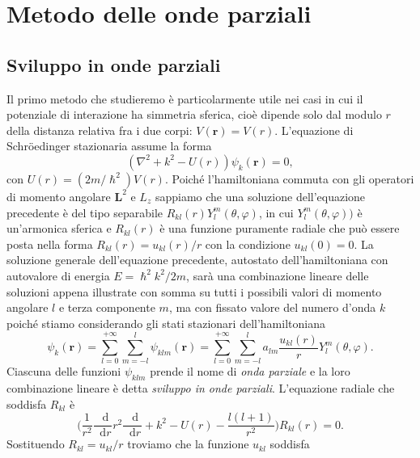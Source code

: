 \documentclass[a4paper,fleqn,twoside,12pt]{article}
\renewcommand{\phi}{\varphi}
\newcommand*{\dd}{\mathop{}\!\mathrm{d}} %
\newcommand*{\toder}[3][]{\frac{{\dd^{#1}}#2}{\dd {#3}^{#1}}}
\begin{document}
\section{Metodo delle onde parziali}
\label{sec:onde-parziali}

\subsection{Sviluppo in onde parziali}
\label{sec:sviluppo-onde}

Il primo metodo che studieremo è particolarmente utile nei casi in cui il
potenziale di interazione ha simmetria sferica, cioè dipende solo dal modulo $r$
della distanza relativa fra i due corpi: $V(\bm{r}) = V(r)$.  L'equazione di
Schröedinger stazionaria assume la forma
\begin{equation}
  (\nabla^{2} + k^{2} - U(r)) \psi_{k}(\bm{r}) = 0,
\end{equation}
con $U(r) = (2m/\hslash^{2})V(r)$.  Poiché l'hamiltoniana commuta con gli
operatori di momento angolare $\bm{L}^{2}$ e $L_{z}$ sappiamo che una soluzione
dell'equazione precedente è del tipo separabile
$R_{kl}(r)Y_{l}^{m}(\theta,\phi)$, in cui $Y_{l}^{m}(\theta,\phi))$ è
un'armonica sferica e $R_{kl}(r)$ è una funzione puramente radiale che può
essere posta nella forma $R_{kl}(r) = u_{kl}(r)/r$ con la condizione
$u_{kl}(0) = 0$.  La soluzione generale dell'equazione precedente, autostato
dell'hamiltoniana con autovalore di energia $E = \hslash^{2}k^{2}/2m$, sarà una
combinazione lineare delle soluzioni appena illustrate con somma su tutti i
possibili valori di momento angolare $l$ e terza componente $m$, ma con fissato
valore del numero d'onda $k$ poiché stiamo considerando gli stati stazionari
dell'hamiltoniana
\begin{equation}
  \label{eq:onde-parziali1}
  \psi_{k}(\bm{r}) = \sum_{l = 0}^{+\infty} \sum_{m = -l}^{l} \psi_{klm}(\bm{r})
  = \sum_{l = 0}^{+\infty} \sum_{m = -l}^{l} a_{lm}
  \frac{u_{kl}(r)}{r}Y_{l}^{m}(\theta,\phi).
\end{equation}
Ciascuna delle funzioni $\psi_{klm}$ prende il nome di \emph{onda parziale} e la
loro combinazione lineare è detta \emph{sviluppo in onde parziali}.  L'equazione
radiale che soddisfa $R_{kl}$ è
\begin{equation}
  \label{eq:diff-R-op}
  \bigg(\frac{1}{r^{2}}\toder{}{r}r^{2}\toder{}{r} + k^{2} - U(r) -
  \frac{l(l+1)}{r^{2}}\bigg)R_{kl}(r) = 0.
\end{equation}
Sostituendo $R_{kl}=u_{kl}/r$ troviamo che la funzione $u_{kl}$ soddisfa
\end{document}
